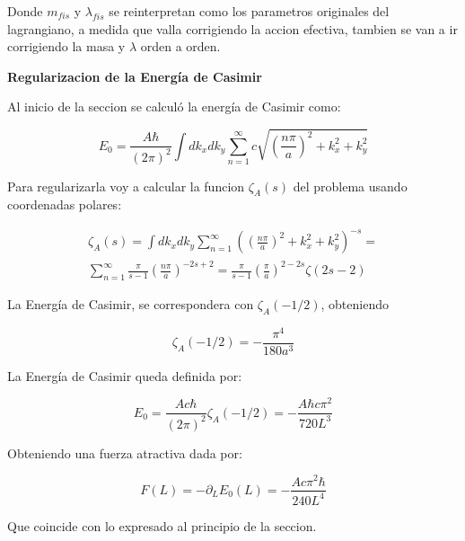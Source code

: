 Donde $m _{fis}$ y $ \lambda _{fis} $ se reinterpretan como los parametros originales del lagrangiano, a medida que valla corrigiendo la accion efectiva, tambien se van a ir corrigiendo la masa y $\lambda $ orden a orden.

\textbf{Regularizacion de la Energía de Casimir}

Al inicio de la seccion se calculó la energía de Casimir como:

\begin{equation}
E _0 = \frac{A \hbar }{(2 \pi) ^2} \int dk _x dk _y 
\sum _{n=1} ^{\infty} 
c
\sqrt{
		\left( \frac{n \pi}{a } \right) ^2 + k _x ^2 + k _y ^2
		}
\end{equation}

Para regularizarla voy a calcular la funcion $\zeta _A (s)$ del problema usando coordenadas polares:

\begin{equation}
\begin{array}{c}

\zeta _A (s) = 
\int dk _x dk _y 
\sum _{n=1} ^{\infty} 
\left(	\left( \frac{n \pi}{a } \right) ^2 + k _x ^2 + k _y ^2
		\right) ^{-s} = \\
\sum _{n=1} ^{\infty}  \frac{\pi}{s-1} \left( \frac{n \pi}{a} \right) ^{-2s+2} =
\frac{\pi}{s-1} \left( \frac{\pi}{a} \right) ^{2-2s} \zeta (2s-2) 

\end{array}
\end{equation}

La Energía de Casimir, se correspondera con $\zeta _A (-1/2)$, obteniendo 


\begin{equation}
\zeta _A (-1/2) = 
- \frac{\pi ^4}{180 a ^3}
\end{equation}

La Energía de Casimir queda definida por:

\begin{equation}
E _0 =  \frac{A c \hbar}{(2 \pi) ^2}
\zeta _A (-1/2) =
- \frac{A \hbar c \pi ^2}
		{720 L ^3}
\end{equation}

Obteniendo una fuerza atractiva dada por:

\begin{equation}
F(L) = - \partial _L E _0 (L) = 
- \frac{A c \pi ^2 \hbar}{240 L^4}
\end{equation}

Que coincide con lo expresado al principio de la seccion. \\ \\


